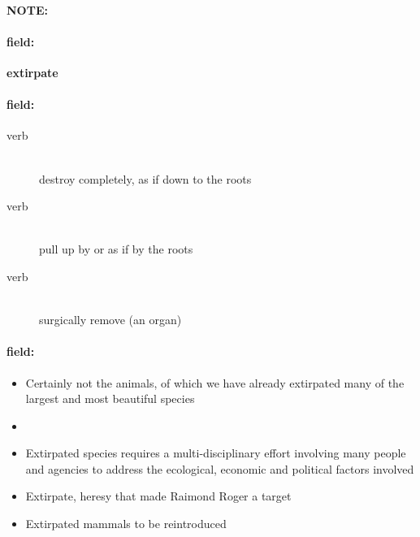 \documentclass[12pt]{article}
\newenvironment{note}{\paragraph{NOTE:}}{}
\newenvironment{field}{\paragraph{field:}}{}
\begin{document}
\begin{note}
\begin{field}
\textbf{\large extirpate}
\end{field}


\begin{field}
\begin{description}
\item[verb] \hfill \\ 
destroy completely, as if down to the roots

\item[verb] \hfill \\ 
pull up by or as if by the roots

\item[verb] \hfill \\ 
surgically remove (an organ)

\end{description}
\end{field}

\begin{field}
\begin{itemize}
\item Certainly not the animals, of which we have already extirpated many of the largest and most beautiful species
\item 
\item Extirpated species requires a multi-disciplinary effort involving many people and agencies to address the ecological, economic and political factors involved
\item Extirpate, heresy that made Raimond Roger a target
\item Extirpated mammals to be reintroduced
\end{itemize}
\end{field}
\end{note}
\end{document}
